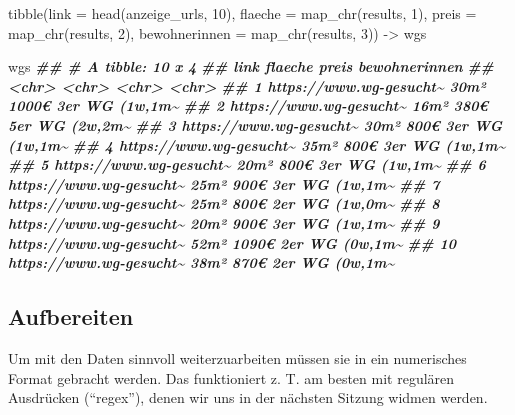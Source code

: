 \documentclass[
  ngerman,
]{article}
\newenvironment{Shaded}{\begin{snugshade}}{\end{snugshade}}
\newcommand{\AttributeTok}[1]{\textcolor[rgb]{0.77,0.63,0.00}{#1}}
\newcommand{\DecValTok}[1]{\textcolor[rgb]{0.00,0.00,0.81}{#1}}
\newcommand{\DocumentationTok}[1]{\textcolor[rgb]{0.56,0.35,0.01}{\textbf{\textit{#1}}}}
\newcommand{\FunctionTok}[1]{\textcolor[rgb]{0.00,0.00,0.00}{#1}}
\newcommand{\NormalTok}[1]{#1}
\newcommand{\OtherTok}[1]{\textcolor[rgb]{0.56,0.35,0.01}{#1}}
\begin{document}
\begin{Shaded}
\begin{Highlighting}[]
\FunctionTok{tibble}\NormalTok{(}\AttributeTok{link =} \FunctionTok{head}\NormalTok{(anzeige\_urls, }\DecValTok{10}\NormalTok{),}
       \AttributeTok{flaeche =} \FunctionTok{map\_chr}\NormalTok{(results, }\DecValTok{1}\NormalTok{),}
       \AttributeTok{preis =} \FunctionTok{map\_chr}\NormalTok{(results, }\DecValTok{2}\NormalTok{),}
       \AttributeTok{bewohnerinnen =} \FunctionTok{map\_chr}\NormalTok{(results, }\DecValTok{3}\NormalTok{)) }\OtherTok{{-}\textgreater{}}\NormalTok{ wgs}

\NormalTok{wgs}
\DocumentationTok{\#\# \# A tibble: 10 x 4}
\DocumentationTok{\#\#    link                    flaeche preis bewohnerinnen }
\DocumentationTok{\#\#    \textless{}chr\textgreater{}                   \textless{}chr\textgreater{}   \textless{}chr\textgreater{} \textless{}chr\textgreater{}         }
\DocumentationTok{\#\#  1 https://www.wg{-}gesucht\textasciitilde{} 30m²    1000€ 3er WG (1w,1m\textasciitilde{}}
\DocumentationTok{\#\#  2 https://www.wg{-}gesucht\textasciitilde{} 16m²    380€  5er WG (2w,2m\textasciitilde{}}
\DocumentationTok{\#\#  3 https://www.wg{-}gesucht\textasciitilde{} 30m²    800€  3er WG (1w,1m\textasciitilde{}}
\DocumentationTok{\#\#  4 https://www.wg{-}gesucht\textasciitilde{} 35m²    800€  3er WG (1w,1m\textasciitilde{}}
\DocumentationTok{\#\#  5 https://www.wg{-}gesucht\textasciitilde{} 20m²    800€  3er WG (1w,1m\textasciitilde{}}
\DocumentationTok{\#\#  6 https://www.wg{-}gesucht\textasciitilde{} 25m²    900€  3er WG (1w,1m\textasciitilde{}}
\DocumentationTok{\#\#  7 https://www.wg{-}gesucht\textasciitilde{} 25m²    800€  2er WG (1w,0m\textasciitilde{}}
\DocumentationTok{\#\#  8 https://www.wg{-}gesucht\textasciitilde{} 20m²    900€  3er WG (1w,1m\textasciitilde{}}
\DocumentationTok{\#\#  9 https://www.wg{-}gesucht\textasciitilde{} 52m²    1090€ 2er WG (0w,1m\textasciitilde{}}
\DocumentationTok{\#\# 10 https://www.wg{-}gesucht\textasciitilde{} 38m²    870€  2er WG (0w,1m\textasciitilde{}}
\end{Highlighting}
\end{Shaded}

\hypertarget{aufbereiten}{%
\subsection{Aufbereiten}\label{aufbereiten}}

Um mit den Daten sinnvoll weiterzuarbeiten müssen sie in ein numerisches Format gebracht werden. Das funktioniert z. T. am besten mit regulären Ausdrücken (``regex''), denen wir uns in der nächsten Sitzung widmen werden.
\end{document}
